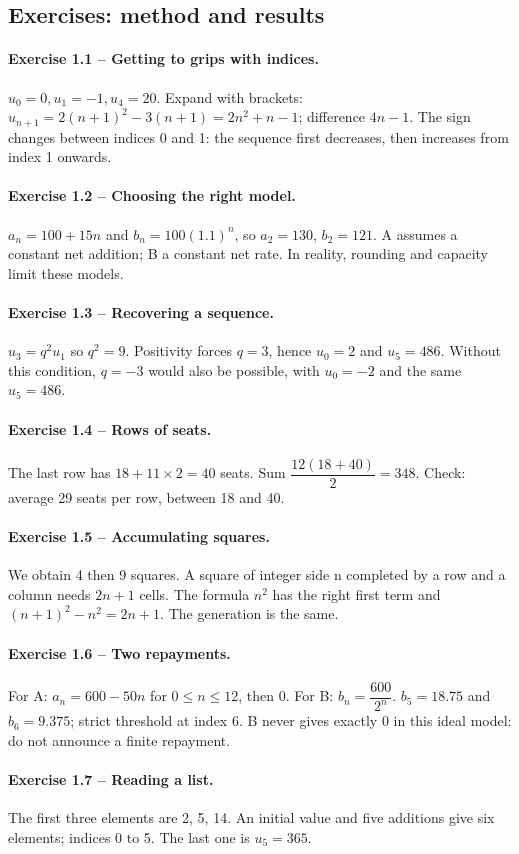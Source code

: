 \subsection*{Exercises: method and results}
\paragraph{Exercise 1.1 -- Getting to grips with indices.} $u_0=0,u_1=-1,u_4=20$. Expand with brackets: $u_{n+1}=2(n+1)^2-3(n+1)=2n^2+n-1$; difference $4n-1$. The sign changes between indices 0 and 1: the sequence first decreases, then increases from index 1 onwards.
\paragraph{Exercise 1.2 -- Choosing the right model.} $a_n=100+15n$ and $b_n=100(1.1)^n$, so $a_2=130$, $b_2=121$. A assumes a constant net addition; B a constant net rate. In reality, rounding and capacity limit these models.
\paragraph{Exercise 1.3 -- Recovering a sequence.} $u_3=q^2u_1$ so $q^2=9$. Positivity forces $q=3$, hence $u_0=2$ and $u_5=486$. Without this condition, $q=-3$ would also be possible, with $u_0=-2$ and the same $u_5=486$.
\paragraph{Exercise 1.4 -- Rows of seats.} The last row has $18+11\times2=40$ seats. Sum $\dfrac{12(18+40)}{2}=348$. Check: average 29 seats per row, between 18 and 40.
\paragraph{Exercise 1.5 -- Accumulating squares.} We obtain 4 then 9 squares. A square of integer side n completed by a row and a column needs $2n+1$ cells. The formula $n^2$ has the right first term and $(n+1)^2-n^2=2n+1$. The generation is the same.
\paragraph{Exercise 1.6 -- Two repayments.} For A: $a_n=600-50n$ for $0\leq n\leq12$, then 0. For B: $b_n=\dfrac{600}{2^n}$. $b_5=18.75$ and $b_6=9.375$; strict threshold at index 6. B never gives exactly 0 in this ideal model: do not announce a finite repayment.
\paragraph{Exercise 1.7 -- Reading a list.} The first three elements are 2, 5, 14. An initial value and five additions give six elements; indices 0 to 5. The last one is $u_5=365$.
